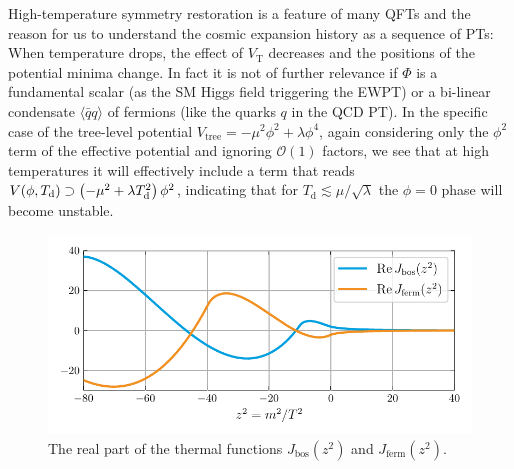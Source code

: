 High-temperature symmetry restoration is a feature of many \acp{QFT} and the reason for us to understand the cosmic expansion history as a sequence of \acp{PT}: When temperature drops, the effect of $V_\text{T}$ decreases and the positions of the potential minima change. In fact it is not of further relevance if $\Phi$ is a fundamental scalar (as the \ac{SM} Higgs field triggering the \ac{EWPT}) or a bi-linear condensate $\langle \bar{q} q \rangle$ of fermions (like the quarks $q$ in the \ac{QCD} \ac{PT}). In the specific case  of the tree-level potential $V_\text{tree} = - \mu^2 \phi^2 + \lambda \phi^4$, again considering only the $\phi^2$ term of the effective potential and ignoring $\mathcal{O}(1)$ factors, we see that at high temperatures it will effectively include a term that reads $V(\phi, T_\text{d}) \supset \left( -\mu^2 + \lambda T_\text{d}^2 \right) \phi^2$, indicating that for $T_\text{d} \lesssim \mu / \sqrt{\lambda}$ the $\phi = 0$ phase will become unstable.

\begin{figure}[t]
	\centering
	\includegraphics[width=\linewidth]{thesisplots/thermal_functions/thermal_functions}
	\caption{The real part of the thermal functions $J_\text{bos}(z^2)$ and $J_\text{ferm}(z^2)$.}
	\label{fig:thermalfunctions}
\end{figure}



